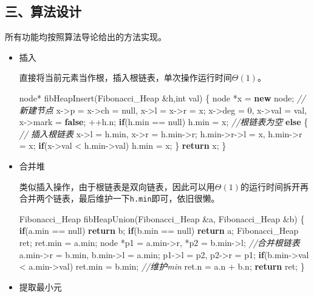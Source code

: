 \documentclass[]{article}
\newenvironment{Shaded}{}{}
\newcommand{\CommentTok}[1]{\textcolor[rgb]{0.38,0.63,0.69}{\textit{#1}}}
\newcommand{\ControlFlowTok}[1]{\textcolor[rgb]{0.00,0.44,0.13}{\textbf{#1}}}
\newcommand{\DataTypeTok}[1]{\textcolor[rgb]{0.56,0.13,0.00}{#1}}
\newcommand{\DecValTok}[1]{\textcolor[rgb]{0.25,0.63,0.44}{#1}}
\newcommand{\KeywordTok}[1]{\textcolor[rgb]{0.00,0.44,0.13}{\textbf{#1}}}
\newcommand{\NormalTok}[1]{#1}
\begin{document}
\hypertarget{header-n22}{%
\subsection{三、算法设计}\label{header-n22}}

所有功能均按照算法导论给出的方法实现。

\begin{itemize}
\item
  插入

  直接将当前元素当作根，插入根链表，单次操作运行时间\(\Theta(1)\)。

\begin{Shaded}
\begin{Highlighting}[]
\NormalTok{node* fibHeapInsert(Fibonacci_Heap &h,}\DataTypeTok{int}\NormalTok{ val) \{}
\NormalTok{    node *x = }\KeywordTok{new}\NormalTok{ node; }\CommentTok{//新建节点}
\NormalTok{    x->p = x->ch = null, x->l = x->r = x;}
\NormalTok{    x->deg = }\DecValTok{0}\NormalTok{, x->val = val, x->mark = }\KeywordTok{false}\NormalTok{;}
\NormalTok{    ++h.n;}
    \ControlFlowTok{if}\NormalTok{(h.min == null) h.min = x; }\CommentTok{//根链表为空}
    \ControlFlowTok{else}\NormalTok{ \{ }\CommentTok{// 插入根链表}
\NormalTok{        x->l = h.min, x->r = h.min->r;}
\NormalTok{        h.min->r->l = x, h.min->r = x;}
        \ControlFlowTok{if}\NormalTok{(x->val < h.min->val) h.min = x;}
\NormalTok{    \}}
    \ControlFlowTok{return}\NormalTok{ x;    }
\NormalTok{\}}
\end{Highlighting}
\end{Shaded}
\item
  合并堆

  类似插入操作，由于根链表是双向链表，因此可以用\(\Theta(1)\)的运行时间拆开再合并两个链表，最后维护一下\texttt{h.min}即可，依旧很懒。

\begin{Shaded}
\begin{Highlighting}[]
\NormalTok{Fibonacci_Heap fibHeapUnion(Fibonacci_Heap &a, Fibonacci_Heap &b) \{}
    \ControlFlowTok{if}\NormalTok{(a.min == null) }\ControlFlowTok{return}\NormalTok{ b; }\ControlFlowTok{if}\NormalTok{(b.min == null) }\ControlFlowTok{return}\NormalTok{ a;}
\NormalTok{    Fibonacci_Heap ret;}
\NormalTok{    ret.min = a.min;}
\NormalTok{    node *p1 = a.min->r, *p2 = b.min->l; }\CommentTok{//合并根链表}
\NormalTok{    a.min->r = b.min, b.min->l = a.min;}
\NormalTok{    p1->l = p2, p2->r = p1;}
    \ControlFlowTok{if}\NormalTok{(b.min->val < a.min->val) ret.min = b.min; }\CommentTok{//维护min}
\NormalTok{    ret.n = a.n + b.n;}
    \ControlFlowTok{return}\NormalTok{ ret;}
\NormalTok{\}}
\end{Highlighting}
\end{Shaded}
\item
  提取最小元


\end{itemize}
\end{document}
